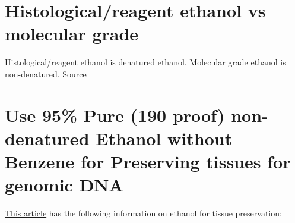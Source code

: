 \documentclass[
  letterpaper,
  DIV=11,
  numbers=noendperiod]{scrreprt}
\begin{document}
\hypertarget{histologicalreagent-ethanol-vs-molecular-grade}{%
\section*{\texorpdfstring{\textbf{Histological/reagent ethanol vs
molecular
grade}}{Histological/reagent ethanol vs molecular grade}}\label{histologicalreagent-ethanol-vs-molecular-grade}}

Histological/reagent ethanol is denatured ethanol. Molecular grade
ethanol is non-denatured.
\href{https://www.differencebetween.com/difference-between-denatured-and-vs-undenatured-ethanol/\#Undenatured\%20Ethanol}{Source}

\hypertarget{use-95-pure-190-proof-non-denatured-ethanol-without-benzene-for-preserving-tissues-for-genomic-dna}{%
\section*{\texorpdfstring{\textbf{Use 95\% Pure (190 proof)
non-denatured Ethanol without Benzene for Preserving tissues for genomic
DNA}}{Use 95\% Pure (190 proof) non-denatured Ethanol without Benzene for Preserving tissues for genomic DNA}}\label{use-95-pure-190-proof-non-denatured-ethanol-without-benzene-for-preserving-tissues-for-genomic-dna}}

\href{https://link.springer.com/article/10.1007/s13127-010-0012-4}{This
article} has the following information on ethanol for tissue
preservation:
\end{document}
